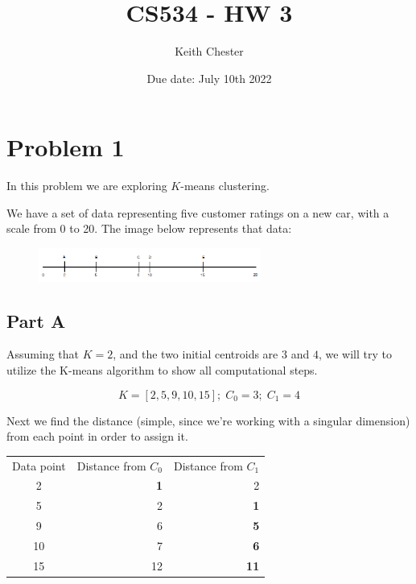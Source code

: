 \documentclass{article}
\title{CS534 - HW 3}
\author{Keith Chester}
\date{Due date: July 10th 2022}
\begin{document}
\maketitle

\section*{Problem 1}

In this problem we are exploring $K$-means clustering.

We have a set of data representing five customer ratings on a new car, with a scale from 0 to 20. The image below represents that data:

\begin{figure}[H]
    \centering
    \includegraphics[width = 0.65\textwidth]{imgs/problem1_data.png}
\end{figure}

\subsection*{Part A}

Assuming that $K=2$, and the two initial centroids are $3$ and $4$, we will try to utilize the K-means algorithm to show all computational steps.

\begin{equation}
    K = [2, 5, 9, 10, 15];\; C_0 = 3;\;  C_1 = 4
\end{equation}

\noindent Next we find the distance (simple, since we're working with a singular dimension) from each point in order to assign it.

\begin{center}
    \begin{tabular}{c r r}
        Data point & Distance from $C_0$ & Distance from $C_1$\\
        2 & \textbf{1} & 2 \\
        5 & 2 & \textbf{1} \\
        9 & 6 & \textbf{5} \\
        10 & 7 & \textbf{6} \\
        15 & 12 & \textbf{11} \\
    \end{tabular}
\end{center}
\end{document}

